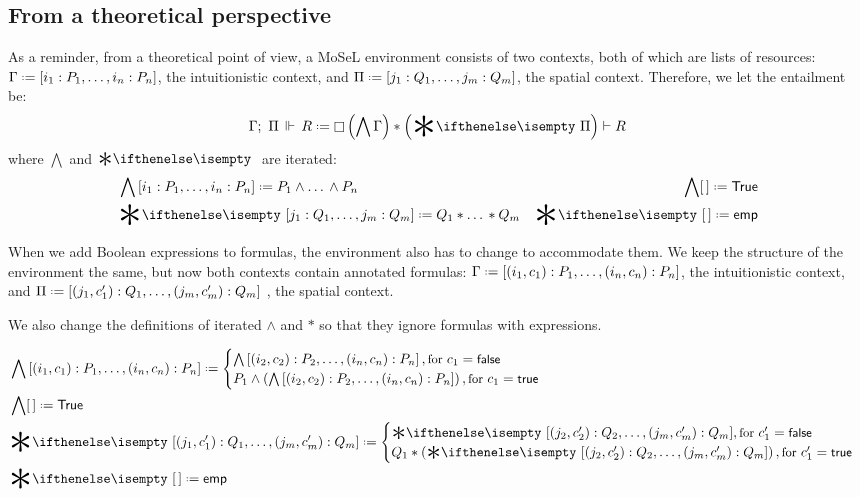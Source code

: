 \subsection{From a theoretical perspective}

As a reminder, from a theoretical point of view, a MoSeL environment consists of two contexts, both of which are lists of resources:
\(\IntuD \defeq \left[i_1 : P_1, \ldots , i_n : P_n \right]\), the intuitionistic context, and \(\SpatD \defeq \left[j_1 : Q_1, \ldots , j_m : Q_m \right]\), the spatial context.
Therefore, we let the entailment be: \[\entailsD R \defeq \intuit \left(\bigwedge \IntuD\right) * \left(\Sep \SpatD\right) \vdash R\]
where \(\bigwedge\) and \(\Sep\) are iterated:
\begin{align*}
  & \bigwedge  \left[i_1 : P_1, \ldots , i_n : P_n \right] \defeq P_1 \wedge \dots\, \wedge P_n
  & \bigwedge [\,] \defeq \True \\
  & \Sep {\left[j_1 : Q_1, \ldots , j_m : Q_m \right]} \defeq Q_1 * \dots\, * Q_m
  & \Sep {[\,]} \defeq \emp
\end{align*}

When we add Boolean expressions to formulas, the environment also has to change to accommodate them.
We keep the structure of the environment the same, but now both contexts contain annotated formulas: \(\IntuD \defeq \left[(i_1, c_1) : P_1, \ldots , (i_n,c_n) : P_n \right]\), the intuitionistic context, and \(\SpatD \defeq [(j_1, c'_1) :Q_1 , \ldots, (j_m, c'_m) :Q_m]\) , the spatial context.

We also change the definitions of iterated \(\wedge\) and \(*\) so that they ignore formulas with \false expressions.

\begin{minipage}[t]{1\linewidth}
  \begin{align*}
    & \bigwedge  \left[(i_1, c_1) : P_1, \ldots , (i_n,c_n) : P_n \right] \defeq
      \begin{cases}
        \bigwedge \left[(i_2, c_2) : P_2, \ldots , (i_n,c_n) : P_n \right],
          {\small \text{for } c_1 = \false}\\
        P_1 \wedge \left( \bigwedge \left[(i_2, c_2) : P_2, \ldots , (i_n,c_n) : P_n \right] \right),
          {\small \text{for } c_1 = \true }
      \end{cases}\\
    & \bigwedge [\,] \defeq \True \\
    & \Sep {\left[(j_1, c'_1) :Q_1 , \ldots, (j_m, c'_m) :Q_m \right]} \defeq
      \begin{cases}
        \Sep {\left[(j_2, c'_2) :Q_2 , \ldots, (j_m, c'_m) :Q_m \right]},
          {\small \text{for } c'_1 = \false} \\
        Q_1 * \left(\Sep {\left[(j_2, c'_2) :Q_2 , \ldots, (j_m, c'_m) :Q_m \right]} \right),
          {\small \text{for } c'_1 = \true}
      \end{cases}\\
    & \Sep {[\,]} \defeq \emp
  \end{align*}
\end{minipage}


